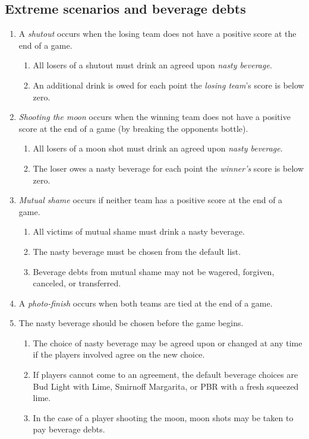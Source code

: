\documentclass[11pt,letterpaper,twocolumn,english,DIV=calc]{scrartcl}
\begin{document}
\subsection{Extreme scenarios and beverage debts}
\begin{enumerate}[leftmargin=2.8em, label=\thesubsection.\arabic*]
	\item A \emph{shutout} occurs when the losing team does not have a positive score at the end of a game.

	\begin{enumerate}
		\item All losers of a shutout must drink an agreed upon \emph{nasty beverage}.
		\item An additional drink is owed for each point the \emph{losing team}'s score is below zero.
	\end{enumerate}

	\item \emph{Shooting the moon} occurs when the winning team does not have a positive score at the end of a game (by breaking the opponents bottle).

	\begin{enumerate}
		\item All losers of a moon shot must drink an agreed upon \emph{nasty beverage}.
		\item The loser owes a nasty beverage for each point the \emph{winner's} score is below zero.
	\end{enumerate}

	\item \emph{Mutual shame} occurs if neither team has a positive score at the end of a game.

	\begin{enumerate}
		\item All victims of mutual shame must drink a nasty beverage.
		\item The nasty beverage must be chosen from the default list.
		\item Beverage debts from mutual shame may not be wagered, forgiven, canceled, or transferred.
	\end{enumerate}

	\item A \emph{photo-finish} occurs when both teams are tied at the end of a game.
	\item The nasty beverage should be chosen before the game begins.

	\begin{enumerate}
		\item The choice of nasty beverage may be agreed upon or changed at any time if the players involved agree on the new choice.
		\item If players cannot come to an agreement, the default beverage choices are Bud Light with Lime, Smirnoff Margarita, or PBR with a fresh squeezed lime.
		\item In the case of a player shooting the moon, moon shots may be taken to pay beverage debts.
	\end{enumerate}


\end{enumerate}
\end{document}
